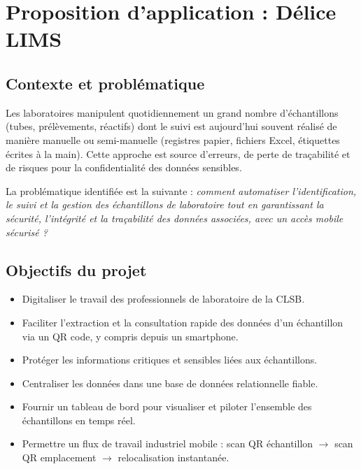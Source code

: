 \documentclass[12pt,a4paper,oneside]{report}
\begin{document}
\chapter{Proposition d'application : Délice LIMS}

\section{Contexte et problématique}
Les laboratoires manipulent quotidiennement un grand nombre d'échantillons (tubes, prélèvements, réactifs) dont le suivi est aujourd'hui souvent réalisé de manière manuelle ou semi-manuelle (registres papier, fichiers Excel, étiquettes écrites à la main). Cette approche est source d'erreurs, de perte de traçabilité et de risques pour la confidentialité des données sensibles.

La problématique identifiée est la suivante : \textit{comment automatiser l'identification, le suivi et la gestion des échantillons de laboratoire tout en garantissant la sécurité, l'intégrité et la traçabilité des données associées, avec un accès mobile sécurisé ?}

\section{Objectifs du projet}
\begin{itemize}
\item Digitaliser le travail des professionnels de laboratoire de la CLSB.
\item Faciliter l'extraction et la consultation rapide des données d'un échantillon via un QR code, y compris depuis un smartphone.
\item Protéger les informations critiques et sensibles liées aux échantillons.
\item Centraliser les données dans une base de données relationnelle fiable.
\item Fournir un tableau de bord pour visualiser et piloter l'ensemble des échantillons en temps réel.
\item Permettre un flux de travail industriel mobile : scan QR échantillon $\rightarrow$ scan QR emplacement $\rightarrow$ relocalisation instantanée.
\end{itemize}
\end{document}
